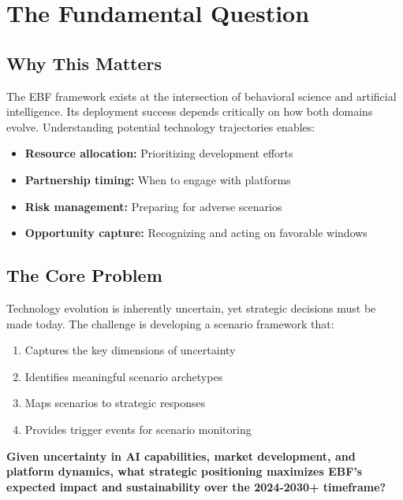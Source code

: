 \section{The Fundamental Question}
\label{sec:vvv1-fundamental}

\subsection{Why This Matters}

The EBF framework exists at the intersection of behavioral science and
artificial intelligence. Its deployment success depends critically on
how both domains evolve. Understanding potential technology trajectories
enables:
\begin{itemize}
    \item \textbf{Resource allocation:} Prioritizing development efforts
    \item \textbf{Partnership timing:} When to engage with platforms
    \item \textbf{Risk management:} Preparing for adverse scenarios
    \item \textbf{Opportunity capture:} Recognizing and acting on favorable windows
\end{itemize}

\subsection{The Core Problem}

Technology evolution is inherently uncertain, yet strategic decisions must
be made today. The challenge is developing a scenario framework that:
\begin{enumerate}
    \item Captures the key dimensions of uncertainty
    \item Identifies meaningful scenario archetypes
    \item Maps scenarios to strategic responses
    \item Provides trigger events for scenario monitoring
\end{enumerate}

\begin{tcolorbox}[colback=red!5!white, colframe=red!75!black,
    title=The Fundamental Question]
\textbf{Given uncertainty in AI capabilities, market development, and platform
dynamics, what strategic positioning maximizes EBF's expected impact and
sustainability over the 2024-2030+ timeframe?}
\end{tcolorbox}



